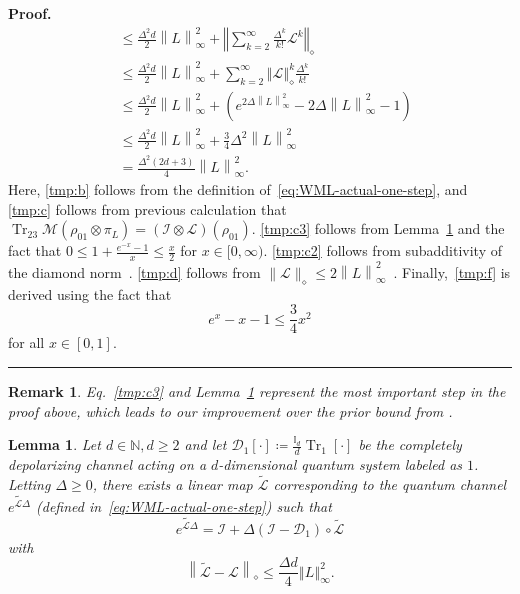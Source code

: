 \documentclass[superscriptaddress,amsmath,amssymb,aps,pra,letterpaper,tightenlines,notitlepages,12pt]{revtex4-2}
\newtheorem{lemma}[theorem]{Lemma}
\newtheorem{remark}[theorem]{Remark}
\newenvironment{proof}[1][Proof]{\noindent\textbf{#1.} }{\ \rule{0.5em}{0.5em}}
\begin{document}
\begin{proof}
\begin{align}
    & \leq    \frac{\Delta^2d}{2} \left\|L\right\|_\infty^2 + \left\Vert\sum_{k=2}^\infty \frac{\Delta^k}{k!}\mathcal{L}^k\right\Vert_\diamond \label{tmp:c3} \\
    & \leq   \frac{\Delta^2d}{2} \left\|L\right\|_\infty^2 + \sum_{k=2}^\infty\left\Vert \mathcal{L}\right\Vert^k_\diamond\frac{\Delta^k}{k!} \label{tmp:c2}\\
    & \leq \frac{\Delta^2d}{2}\left\|L\right\|_\infty^2 + (e^{2\Delta\left\|L\right\|_\infty^2}-2\Delta\left\|L\right\|_\infty^2-1) \label{tmp:d} \\
    & \leq \frac{\Delta^2d}{2} \left\|L\right\|_\infty^2 + \frac{3}{4}\Delta^2\left\|L\right\|_\infty^2 \\
    & = \frac{\Delta^2(2d+3)}{4} \left\|L\right\|_\infty^2.
    \label{tmp:f}
\end{align}
Here, \eqref{tmp:b} follows from the definition of~\eqref{eq:WML-actual-one-step}, and \eqref{tmp:c} follows from previous calculation that $\operatorname{Tr}_{23}\mathcal{M}(\rho_{01}\otimes\pi_L)=(\mathcal{I}\otimes\mathcal{L})(\rho_{01})$. \eqref{tmp:c3} follows from Lemma~\ref{lem:main-upper-lemma} and the fact that $0\leq1+\frac{e^{-x}-1}{x}\leq \frac{x}{2}$ for $x\in[0, \infty)$. \eqref{tmp:c2} follows from subadditivity of the diamond norm~\cite[Appendix B]{go2025SamplebasedHamiltonianLindbladian}. \eqref{tmp:d} follows from $\|\mathcal{L}\|_\diamond\leq2\left\|L\right\|_\infty^2$~\cite[Appendix D]{go2025SamplebasedHamiltonianLindbladian}. Finally,~\eqref{tmp:f} is derived using the fact that
\begin{equation}
e^x-x-1\leq \frac{3}{4}x^2 \label{eq:e-to-x-quad-bound}    
\end{equation}
for all $x\in[0, 1]$.
\end{proof}

\begin{remark}
Eq.~\eqref{tmp:c3} and Lemma~\ref{lem:main-upper-lemma} represent the most important step in the proof above, which leads to our improvement over the prior bound from \cite{go2025SamplebasedHamiltonianLindbladian}.
\end{remark}

\begin{lemma}\label{lem:main-upper-lemma}
Let $d\in\mathbb{N}, d\geq2$ and let $\mathcal{D}_1[\cdot] \coloneq \frac{\mathbb{I}_d}{d}\operatorname{Tr}_1[\cdot]$ be the completely depolarizing channel acting on a $d$-dimensional quantum system labeled as $1$. Letting $\Delta\geq0$, there exists a linear map $\widetilde{\mathcal{L}}$ corresponding to the quantum channel $\widetilde{e^{\mathcal{L}\Delta}}$ (defined in~\eqref{eq:WML-actual-one-step}) such that
\begin{equation}
    \widetilde{e^{\mathcal{L}\Delta}}=\mathcal{I} + \Delta\left(\mathcal{I}-\mathcal{D}_1\right)\circ\widetilde{\mathcal{L}}
\end{equation}
with
\begin{equation}
    \left\|\widetilde{\mathcal{L}}-\mathcal{L}\right\|_\diamond\leq \frac{\Delta d}{4}\left\Vert L\right\Vert_\infty^2.
\end{equation}
\end{lemma}
\end{document}
